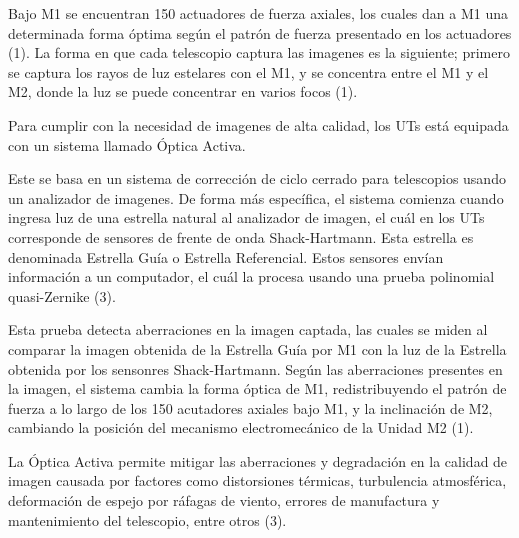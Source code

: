 Bajo M1 se encuentran 150 actuadores de fuerza axiales, los cuales dan a M1 una determinada forma óptima según el patrón de fuerza presentado en los actuadores (1).
La forma en que cada telescopio captura las imagenes es la siguiente; primero se captura los rayos de luz estelares con el M1, y se concentra entre el M1 y el M2, donde la luz se puede concentrar en varios focos (1).

Para cumplir con la necesidad de imagenes de alta calidad, los UTs está equipada con un sistema llamado Óptica Activa. 

Este se basa en un sistema de corrección de ciclo cerrado para telescopios usando un analizador de imagenes.
De forma más específica, el sistema comienza cuando ingresa luz de una estrella natural al analizador de imagen, el cuál en los UTs corresponde de sensores de frente de onda Shack-Hartmann. Esta estrella es denominada Estrella Guía o Estrella Referencial.
Estos sensores envían información a un computador, el cuál la procesa usando una prueba polinomial quasi-Zernike (3).

Esta prueba detecta aberraciones en la imagen captada, las cuales se miden al comparar la imagen obtenida de la Estrella Guía por M1 con la luz de la Estrella obtenida por los sensonres Shack-Hartmann.
Según las aberraciones presentes en la imagen, el sistema cambia la forma óptica de M1, redistribuyendo el patrón de fuerza a lo largo de los 150 acutadores axiales bajo M1, y la inclinación de M2, cambiando la posición del mecanismo electromecánico de la Unidad M2 (1).

La Óptica Activa permite mitigar las aberraciones y degradación en la calidad de imagen causada por factores como distorsiones térmicas, turbulencia atmosférica, deformación de espejo por ráfagas de viento, errores de manufactura y mantenimiento del telescopio, entre otros (3).

